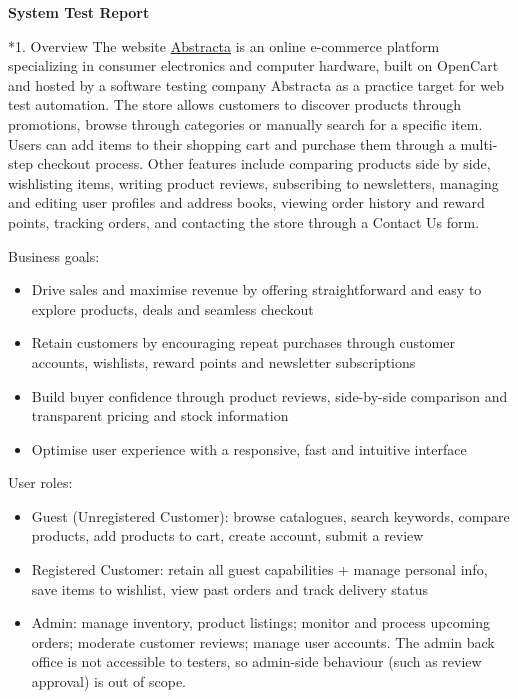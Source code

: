 \documentclass[11pt,a4paper]{article}
\makeatletter
\renewcommand\section{\@startsection{section}{1}{0pt}{3ex plus 1ex}{1.2ex}{\LARGE\bfseries}}
\makeatother
\begin{document}
\begin{center}
  {\huge\bfseries System Test Report}
\end{center}

\section*{1. Overview}
The website \href{https://opencart.abstracta.us/index.php?route=common/home}{Abstracta} is an online e-commerce platform specializing in consumer electronics and computer hardware, built on OpenCart and hosted by a software testing company Abstracta as a practice target for web test automation. The store allows customers to discover products through promotions, browse through categories or manually search for a specific item. Users can add items to their shopping cart and purchase them through a multi-step checkout process. Other features include comparing products side by side, wishlisting items, writing product reviews, subscribing to newsletters, managing and editing user profiles and address books, viewing order history and reward points, tracking orders, and contacting the store through a Contact Us form.

Business goals:
\begin{itemize}
  \item Drive sales and maximise revenue by offering straightforward and easy to explore products, deals and seamless checkout
  \item Retain customers by encouraging repeat purchases through customer accounts, wishlists, reward points and newsletter subscriptions
  \item Build buyer confidence through product reviews, side-by-side comparison and transparent pricing and stock information
  \item Optimise user experience with a responsive, fast and intuitive interface
\end{itemize}

User roles:
\begin{itemize}
  \item Guest (Unregistered Customer): browse catalogues, search keywords, compare products, add products to cart, create account, submit a review
  \item Registered Customer: retain all guest capabilities + manage personal info, save items to wishlist, view past orders and track delivery status
  \item Admin: manage inventory, product listings; monitor and process upcoming orders; moderate customer reviews; manage user accounts. The admin back office is not accessible to testers, so admin-side behaviour (such as review approval) is out of scope.
\end{itemize}
\end{document}
